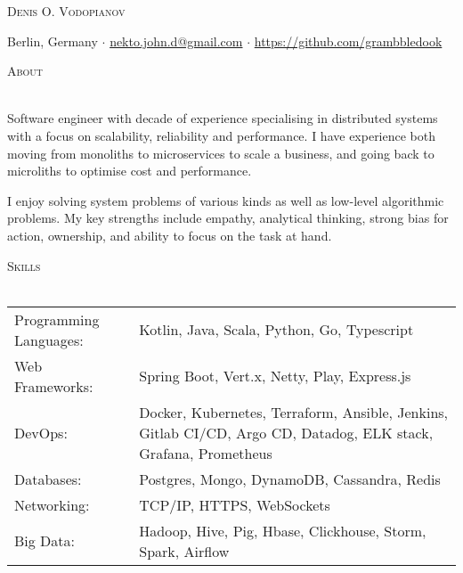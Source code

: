 \documentclass[a4paper]{article}
\makeatletter
\newcommand{\lineunder} {
    \vspace*{-8pt} \\
    \hspace*{-18pt} \hrulefill \\
}
\newcommand{\header} [1] {
        {\hspace*{-18pt}\vspace*{6pt} \textsc{#1}}
    \vspace*{-6pt} \lineunder
}
\def\email{nekto.john.d@gmail.com}
\def\phone{555-55-55}
\makeatother
\begin{document}
    \vspace*{-40pt}


    \vspace*{-10pt}
    \begin{center}
        \Huge \scshape {Denis O. Vodopianov} \\ \vspace{1mm}
    \end{center}

    \begin{center}
        Berlin, Germany $\cdot$
        \href{mailto:\email}{\email} $\cdot$
        \url{https://github.com/grambbledook}\\
    \end{center}

    \header{About}
    \begin{raggedright}
        Software engineer with decade of experience specialising in distributed systems with a focus on scalability, reliability and performance.
        I have experience both moving from monoliths to microservices to scale a business, and going back to microliths
        to optimise cost and performance. \break

        I enjoy solving system problems of various kinds as well as low-level algorithmic problems.
        My key strengths include empathy, analytical thinking, strong bias for action, ownership, and ability to focus on the task at hand.                                                 \\
    \end{raggedright}
    \vspace{2mm}

    \header{Skills}
    \begin{tabularx}{\textwidth}{p{5cm} X}
        Programming Languages: & Kotlin, Java, Scala, Python, Go, Typescript                                                                     \\
        Web Frameworks:        & Spring Boot, Vert.x, Netty, Play, Express.js                                                                    \\
        DevOps:                & Docker, Kubernetes, Terraform, Ansible, Jenkins, Gitlab CI/CD, Argo CD, Datadog, ELK stack, Grafana, Prometheus \\
        Databases:             & Postgres, Mongo, DynamoDB, Cassandra, Redis                                                                     \\
        Networking:            & TCP/IP, HTTPS, WebSockets                                                                                       \\
        Big Data:              & Hadoop, Hive, Pig, Hbase, Clickhouse, Storm, Spark, Airflow                                                     \\
    \end{tabularx}
    \vspace{2mm}
\end{document}
